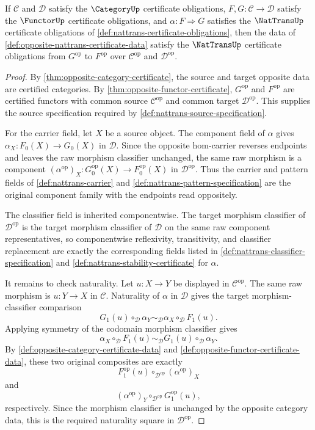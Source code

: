 \begin{theorem}
\label{thm:opposite-natural-transformation-certificate}
If $\mathcal C$ and $\mathcal D$ satisfy the $\CategoryUp$ certificate obligations, $F,G:\mathcal C\to\mathcal D$ satisfy the $\FunctorUp$
certificate obligations, and $\alpha:F\Rightarrow G$ satisfies the $\NatTransUp$ certificate obligations of \autoref{def:nattrans-certificate-obligations},
then the data of \autoref{def:opposite-nattrans-certificate-data} satisfy the $\NatTransUp$ certificate obligations from $G^{\mathrm{op}}$ to
$F^{\mathrm{op}}$ over $\mathcal C^{\mathrm{op}}$ and $\mathcal D^{\mathrm{op}}$.
\end{theorem}
\begin{proof}
By \autoref{thm:opposite-category-certificate}, the source and target opposite data are certified categories. By \autoref{thm:opposite-functor-certificate},
$G^{\mathrm{op}}$ and $F^{\mathrm{op}}$ are certified functors with common source $\mathcal C^{\mathrm{op}}$ and common target $\mathcal D^{\mathrm{op}}$.
This supplies the source specification required by \autoref{def:nattrans-source-specification}.

For the carrier field, let $X$ be a source object. The component field of $\alpha$ gives $\alpha_X:F_0(X)\to G_0(X)$ in $\mathcal D$.
Since the opposite hom-carrier reverses endpoints and leaves the raw morphism classifier unchanged, the same raw morphism is a component
$(\alpha^{\mathrm{op}})_X:G^{\mathrm{op}}_0(X)\to F^{\mathrm{op}}_0(X)$ in $\mathcal D^{\mathrm{op}}$. Thus the carrier and pattern fields of
\autoref{def:nattrans-carrier} and \autoref{def:nattrans-pattern-specification} are the original component family with the endpoints read oppositely.

The classifier field is inherited componentwise. The target morphism classifier of $\mathcal D^{\mathrm{op}}$ is the target morphism classifier
of $\mathcal D$ on the same raw component representatives, so componentwise reflexivity, transitivity, and classifier replacement are exactly the
corresponding fields listed in \autoref{def:nattrans-classifier-specification} and \autoref{def:nattrans-stability-certificate} for $\alpha$.

It remains to check naturality. Let $u:X\to Y$ be displayed in $\mathcal C^{\mathrm{op}}$. The same raw morphism is $u:Y\to X$ in
$\mathcal C$. Naturality of $\alpha$ in $\mathcal D$ gives the target morphism-classifier comparison
$$
G_1(u)\circ_{\mathcal D}\alpha_Y \sim_{\mathcal D} \alpha_X\circ_{\mathcal D}F_1(u).
$$
Applying symmetry of the codomain morphism classifier gives
$$
\alpha_X\circ_{\mathcal D}F_1(u) \sim_{\mathcal D} G_1(u)\circ_{\mathcal D}\alpha_Y.
$$
By \autoref{def:opposite-category-certificate-data} and \autoref{def:opposite-functor-certificate-data}, these two original composites are exactly
$$
F^{\mathrm{op}}_1(u)\circ_{\mathcal D^{\mathrm{op}}}(\alpha^{\mathrm{op}})_X
$$
and
$$
(\alpha^{\mathrm{op}})_Y\circ_{\mathcal D^{\mathrm{op}}}G^{\mathrm{op}}_1(u),
$$
respectively. Since the morphism classifier is unchanged by the opposite category data, this is the required naturality square in $\mathcal D^{\mathrm{op}}$.


\end{proof}

